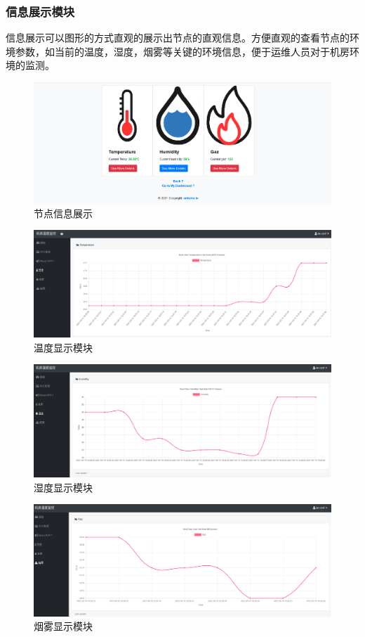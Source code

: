\subsubsection{信息展示模块}
信息展示可以图形的方式直观的展示出节点的直观信息。方便直观的查看节点的环境参数，如当前的温度，湿度，烟雾等关键的环境信息，便于运维人员对于机房环境的监测。
\begin{figure}[H]
	\centering
	\includegraphics[width=0.85\linewidth]{figure/card_data}
	\caption{节点信息展示}
\end{figure}
\begin{figure}[H]
	\centering
	\includegraphics[width=0.85\linewidth]{figure/DHT11}
	\caption{温度显示模块}
\end{figure}
\begin{figure}[H]
	\centering
	\includegraphics[width=0.85\linewidth]{figure/Humidity}
	\caption{湿度显示模块}
\end{figure}
\begin{figure}[H]
	\centering
	\includegraphics[width=0.85\linewidth]{figure/Gaz}
	\caption{烟雾显示模块}
\end{figure}

